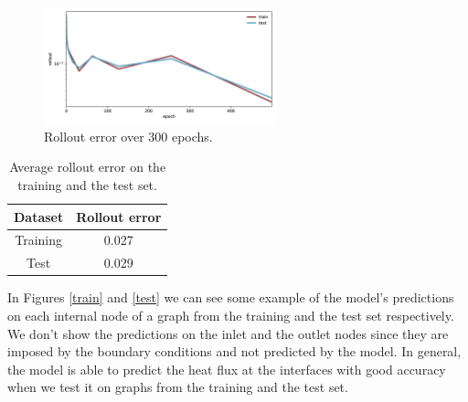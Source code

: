 \documentclass[11pt,a4paper]{article}
\begin{document}
\begin{figure}[H]
    \centering
    \includegraphics[width=0.6\textwidth]{Images/rollout.jpg}
    \caption{Rollout error over 300 epochs.}
    \label{rollout_plot}
\end{figure}

\begin{table}[H]
    \centering
    \begin{tabular}{|c|c|}
        \hline
        \textbf{Dataset} & \textbf{Rollout error} \\
        \hline
        Training & 0.027 \\
        Test & 0.029 \\
        \hline
    \end{tabular}
    \caption{Average rollout error on the training and the test set.}
    \label{errors}
\end{table}

In Figures \ref{train} and \ref{test} we can see some example of the model's predictions on each internal node of a graph from the training and the test set respectively. We don't show the predictions on the inlet and the outlet nodes since they are imposed by the boundary conditions and not predicted by the model.
In general, the model is able to predict the heat flux at the interfaces with good accuracy when we test it on graphs from the training and the test set. 
\end{document}

